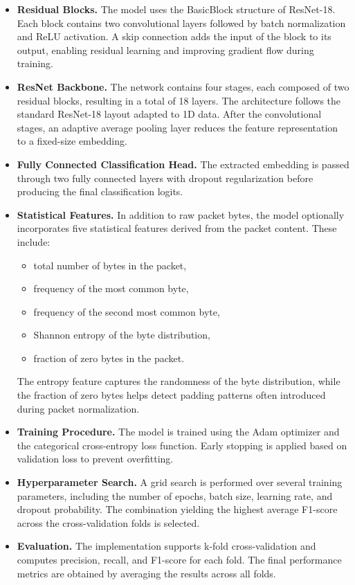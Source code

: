 \begin{itemize}

\item \textbf{Residual Blocks.}  
The model uses the BasicBlock structure of ResNet-18. Each block contains two convolutional layers followed by batch normalization and ReLU activation. A skip connection adds the input of the block to its output, enabling residual learning and improving gradient flow during training.

\item \textbf{ResNet Backbone.}  
The network contains four stages, each composed of two residual blocks, resulting in a total of 18 layers. The architecture follows the standard ResNet-18 layout adapted to 1D data. After the convolutional stages, an adaptive average pooling layer reduces the feature representation to a fixed-size embedding.

\item \textbf{Fully Connected Classification Head.}  
The extracted embedding is passed through two fully connected layers with dropout regularization before producing the final classification logits.

\item \textbf{Statistical Features.}  
In addition to raw packet bytes, the model optionally incorporates five statistical features derived from the packet content. These include:
\begin{itemize}
\item total number of bytes in the packet,
\item frequency of the most common byte,
\item frequency of the second most common byte,
\item Shannon entropy of the byte distribution,
\item fraction of zero bytes in the packet.
\end{itemize}

The entropy feature captures the randomness of the byte distribution, while the fraction of zero bytes helps detect padding patterns often introduced during packet normalization.

\item \textbf{Training Procedure.}  
The model is trained using the Adam optimizer and the categorical cross-entropy loss function. Early stopping is applied based on validation loss to prevent overfitting.

\item \textbf{Hyperparameter Search.}  
A grid search is performed over several training parameters, including the number of epochs, batch size, learning rate, and dropout probability. The combination yielding the highest average F1-score across the cross-validation folds is selected.

\item \textbf{Evaluation.}  
The implementation supports k-fold cross-validation and computes precision, recall, and F1-score for each fold. The final performance metrics are obtained by averaging the results across all folds.

\end{itemize}

